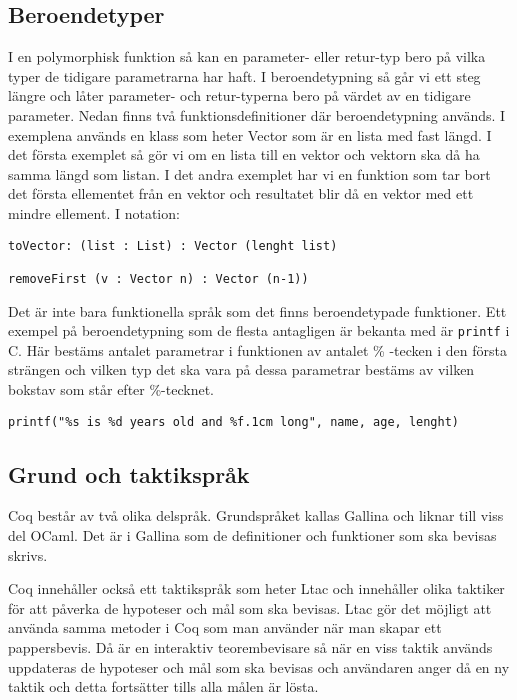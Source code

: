 \subsection{Beroendetyper}
I en polymorphisk funktion så kan en parameter- eller retur-typ bero på vilka
typer de tidigare parametrarna har haft. I beroendetypning så går vi ett steg
längre och låter parameter- och retur-typerna bero på värdet av en
tidigare parameter.
Nedan finns två funktionsdefinitioner där beroendetypning används.
I exemplena används en klass som heter Vector som är en lista med fast längd. I
det första exemplet så gör vi om en lista till en vektor och vektorn ska då ha
samma längd som listan. I det andra exemplet har vi en funktion som tar bort
det första ellementet från en vektor och resultatet blir då en vektor med ett
mindre ellement. I \coq notation:
\begin{verbatim}
toVector: (list : List) : Vector (lenght list)

removeFirst (v : Vector n) : Vector (n-1))
\end{verbatim}

Det är inte bara funktionella språk som det finns beroendetypade funktioner.
Ett exempel på beroendetypning som de flesta antagligen är bekanta med är
\texttt{printf} i C. Här bestäms antalet parametrar i funktionen av antalet
\% -tecken i den första strängen och vilken typ det ska vara på dessa
parametrar bestäms av vilken bokstav som står efter \%-tecknet.
\begin{verbatim}
printf("%s is %d years old and %f.1cm long", name, age, lenght)
\end{verbatim}


\subsection{Grund och taktikspråk}
Coq består av två olika delspråk. Grundspråket kallas Gallina och liknar till
viss del OCaml. Det är i Gallina som de definitioner och funktioner som ska
bevisas skrivs.

Coq innehåller också ett taktikspråk som heter Ltac och innehåller olika
taktiker för att påverka de hypoteser och mål som ska bevisas. Ltac gör det
möjligt att använda samma metoder i Coq som man använder när man skapar ett
pappersbevis. Då \coq är en interaktiv teorembevisare så när en viss taktik
används uppdateras de hypoteser och mål som ska bevisas och användaren
anger då en ny taktik och detta fortsätter tills alla målen är lösta.
